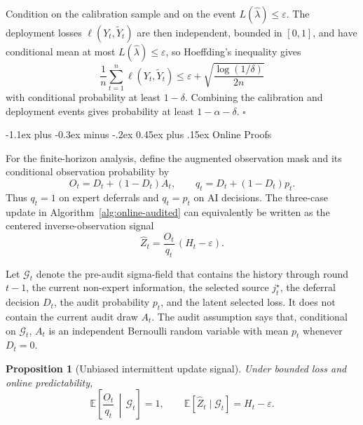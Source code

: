 \documentclass[11pt]{article}
\makeatletter
\renewcommand\subsection{\@startsection{subsection}{2}{\z@}%
  {-1.1ex plus -0.3ex minus -.2ex}%
  {0.45ex plus .15ex}%
  {\normalfont\large\bfseries}}
\newtheorem{proposition}{Proposition}
\newcommand{\E}{\mathbb{E}}
\newcommand{\calG}{\mathcal{G}}
\newcommand{\tildeY}{\widetilde Y}
\newcommand{\eps}{\varepsilon}
\makeatother
\begin{document}
Condition on the calibration sample and on the event \(L(\hat\lambda)\le\eps\).
The deployment losses \(\ell(Y_t,\tildeY_t)\) are then independent, bounded in
\([0,1]\), and have conditional mean at most \(L(\hat\lambda)\le\eps\), so
Hoeffding's inequality gives
\[
    \frac1n\sum_{t=1}^n\ell(Y_t,\tildeY_t)
    \le
    \eps+\sqrt{\frac{\log(1/\delta)}{2n}}
\]
with conditional probability at least $1-\delta$. Combining the calibration and
deployment events gives probability at least $1-\alpha-\delta$. \hfill$\square$

\subsection{Online Proofs}
\label{app:online-proofs}

For the finite-horizon analysis, define the augmented observation mask and its
conditional observation probability by
\begin{equation}
    O_t=D_t+(1-D_t)A_t,
    \qquad
    q_t=D_t+(1-D_t)p_t .
    \label{eq:online-augmented-mask}
\end{equation}
Thus $q_t=1$ on expert deferrals and $q_t=p_t$ on AI decisions.  The
three-case update in Algorithm~\ref{alg:online-audited} can equivalently be
written as the centered inverse-observation signal
\begin{equation}
    \widehat Z_t
    =
    \frac{O_t}{q_t}\,(H_t-\eps).
    \label{eq:online-centered-signal}
\end{equation}

Let $\calG_t$ denote the pre-audit sigma-field that contains the history
through round $t-1$, the current non-expert information, the selected source
$j_t^\star$, the deferral decision $D_t$, the audit probability $p_t$, and the
latent selected loss.  It does not contain the current audit draw $A_t$.
The audit assumption says that, conditional on $\calG_t$, $A_t$ is an
independent Bernoulli random variable with mean $p_t$ whenever $D_t=0$.


\begin{proposition}[Unbiased intermittent update signal]
\label{prop:online-unbiased}
Under bounded loss and online predictability,
\[
    \E\left[\frac{O_t}{q_t}\,\middle|\,\calG_t\right]=1,
    \qquad
    \E[\widehat Z_t\mid\calG_t]=H_t-\eps.
\]
\end{proposition}
\end{document}
